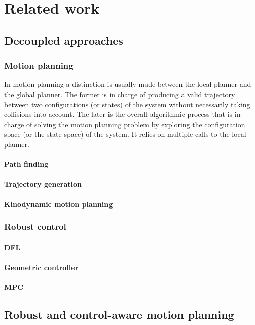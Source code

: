 \chapter{Related work}

\section{Decoupled approaches}
\subsection{Motion planning}
In motion planning a distinction is usually made between the local planner and the global planner. 
The former is in charge of producing a valid trajectory between two configurations (or states) of the system without necessarily taking collisions into account. 
The later is the overall algorithmic process that is in charge of solving the motion planning problem by exploring the configuration space (or the state space) of the system. 
It relies on multiple calls to the local planner.
\subsubsection{Path finding}
\subsubsection{Trajectory generation}
\subsubsection{Kinodynamic motion planning}
\subsection{Robust control}
\subsubsection{DFL}
\subsubsection{Geometric controller}
\subsubsection{MPC}

\section{Robust and control-aware motion planning}
